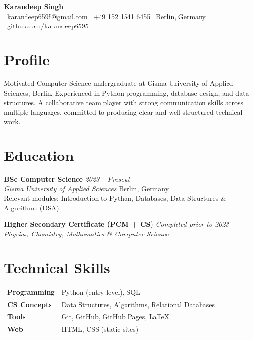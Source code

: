 \documentclass[a4paper,10pt]{article}
\newcommand{\cvitem}[4]{%
  \textbf{#1} \hfill \textit{\color{muted}#2} \\
  \textit{#3} \hfill \color{muted}#4 \\[2pt]
}
\begin{document}
\begin{center}
  {\LARGE\bfseries Karandeep Singh}\\[4pt]
  \color{muted}
  \faEnvelope\ \href{mailto:karandeep6595@gmail.com}{karandeep6595@gmail.com} \quad
  \faPhone\ \href{tel:+4915215416455}{+49 152 1541 6455} \quad
  \faMapMarker*\ Berlin, Germany \\[2pt]
  \faGithub\ \href{https://github.com/karandeep6595-maker}{github.com/karandeep6595}
\end{center}

\vspace{6pt}

\section{Profile}

Motivated Computer Science undergraduate at Gisma University of Applied Sciences, Berlin.
Experienced in Python programming, database design, and data structures. A collaborative
team player with strong communication skills across multiple languages, committed to
producing clear and well-structured technical work.

\section{Education}

\cvitem{BSc Computer Science}{2023 -- Present}
       {Gisma University of Applied Sciences}{Berlin, Germany}
Relevant modules: Introduction to Python, Databases, Data Structures \& Algorithms (DSA)

\vspace{6pt}

\cvitem{Higher Secondary Certificate (PCM + CS)}{Completed prior to 2023}
       {Physics, Chemistry, Mathematics \& Computer Science}{}

\section{Technical Skills}

\begin{tabular}{@{}p{3.5cm} p{11cm}}
  \textbf{Programming}    & Python (entry level), SQL \\
  \textbf{CS Concepts}    & Data Structures, Algorithms, Relational Databases \\
  \textbf{Tools}          & Git, GitHub, GitHub Pages, \LaTeX \\
  \textbf{Web}            & HTML, CSS (static sites) \\
\end{tabular}
\end{document}

